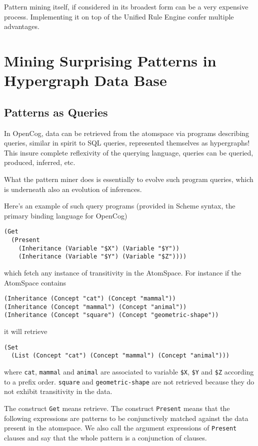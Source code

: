 \documentclass[runningheads]{llncs}
\begin{document}
Pattern mining itself, if considered in its broadest form can be a
very expensive process. Implementing it on top of the Unified Rule
Engine confer multiple advantages.

\section{Mining Surprising Patterns in Hypergraph Data Base}

\subsection{Patterns as Queries}

In OpenCog, data can be retrieved from the atomspace via programs
describing queries, similar in spirit to SQL queries, represented
themselves as hypergraphs! This insure complete reflexivity of the
querying language, queries can be queried, produced, inferred, etc.

What the pattern miner does is essentially to evolve such program
queries, which is underneath also an evolution of inferences.

Here's an example of such query programs (provided in Scheme syntax,
the primary binding language for OpenCog)
\begin{verbatim}
(Get
  (Present
    (Inheritance (Variable "$X") (Variable "$Y"))
    (Inheritance (Variable "$Y") (Variable "$Z"))))
\end{verbatim}
which fetch any instance of transitivity in the AtomSpace. For
instance if the AtomSpace contains
\begin{verbatim}
(Inheritance (Concept "cat") (Concept "mammal"))
(Inheritance (Concept "mammal") (Concept "animal"))
(Inheritance (Concept "square") (Concept "geometric-shape"))
\end{verbatim}
it will retrieve
\begin{verbatim}
(Set
  (List (Concept "cat") (Concept "mammal") (Concept "animal")))
\end{verbatim}
where \texttt{cat}, \texttt{mammal} and \texttt{animal} are associated
to variable \texttt{\$X}, \texttt{\$Y} and \texttt{\$Z} according to a
prefix order. \texttt{square} and \texttt{geometric-shape} are not
retrieved because they do not exhibit transitivity in the data.

The construct \texttt{Get} means retrieve. The construct
\texttt{Present} means that the following expressions are patterns to
be conjunctively matched against the data present in the atomspace. We
also call the argument expressions of \texttt{Present} clauses and say
that the whole pattern is a conjunction of clauses.
\end{document}

